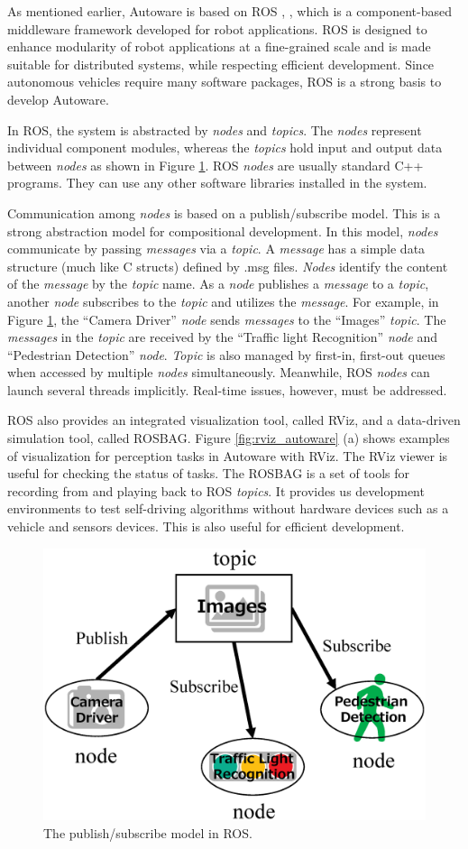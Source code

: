 As mentioned earlier, Autoware is based on ROS \cite{quigley2009ros},
\cite{rosorg}, which is a component-based middleware framework developed
for robot applications. 
ROS is designed to enhance modularity of robot applications at a
fine-grained scale and is made suitable for distributed systems, while
respecting efficient development.
Since autonomous vehicles require many software packages, ROS is a
strong basis to develop Autoware.

In ROS, the system is abstracted by \emph{nodes} and \emph{topics}.
The \emph{nodes} represent individual component modules, whereas the \emph{topics} hold input and output data between \emph{nodes} as shown in Figure \ref{fig:ros_pubsub}.
ROS \emph{nodes} are usually standard C++ programs.
They can use any other software libraries installed in the system.

Communication among \emph{nodes} is based on a publish/subscribe model.
This is a strong abstraction model for compositional development.
In this model, \emph{nodes} communicate by passing \emph{messages} via a \emph{topic}. 
A \emph{message} has a simple data structure (much like C structs) defined by .msg files.
\emph{Nodes} identify the content of the \emph{message} by the \emph{topic} name.
As a \emph{node} publishes a \emph{message} to a \emph{topic}, another \emph{node} subscribes to the \emph{topic} and utilizes the \emph{message}. 
For example, in Figure \ref{fig:ros_pubsub}, the ``Camera Driver'' \emph{node} sends \emph{messages} to the ``Images'' \emph{topic}. 
The \emph{messages} in the \emph{topic} are received by the ``Traffic light Recognition'' \emph{node} and ``Pedestrian Detection'' \emph{node}.
\emph{Topic} is also managed by first-in, first-out queues when accessed by multiple \emph{nodes} simultaneously.
Meanwhile, ROS \emph{nodes} can launch several threads implicitly.
Real-time issues, however, must be addressed.

ROS also provides an integrated visualization tool, called RViz, and a
data-driven simulation tool, called ROSBAG. 
Figure \ref{fig:rviz_autoware} (a) shows examples of visualization for perception tasks in Autoware with RViz.
The RViz viewer is useful for checking the status of tasks.
The ROSBAG is a set of tools for recording from and playing back to ROS \emph{topics}.
It provides us development environments to test self-driving algorithms without hardware devices such as a vehicle and sensors devices.
This is also useful for efficient development.

\begin{figure}[htbp]
  \centering
  \includegraphics[width=0.8\linewidth]{../figure/ros_pubsub.eps}
  \caption{\label{fig:ros_pubsub}
 The publish/subscribe model in ROS.}
\end{figure}

